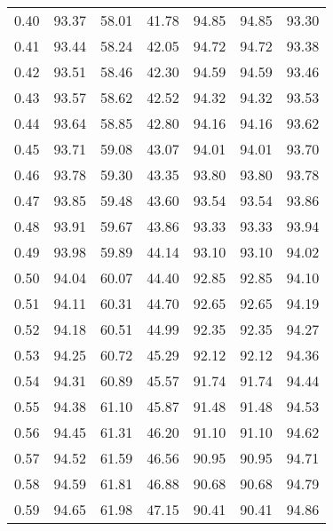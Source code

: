 \begin{tabular}{|c|c|c|c|c|c|c|}
      0.40 &     93.37 &     58.01 &      41.78 &   94.85 &      94.85 &         93.30 \\
      0.41 &     93.44 &     58.24 &      42.05 &   94.72 &      94.72 &         93.38 \\
      0.42 &     93.51 &     58.46 &      42.30 &   94.59 &      94.59 &         93.46 \\
      0.43 &     93.57 &     58.62 &      42.52 &   94.32 &      94.32 &         93.53 \\
      0.44 &     93.64 &     58.85 &      42.80 &   94.16 &      94.16 &         93.62 \\
      0.45 &     93.71 &     59.08 &      43.07 &   94.01 &      94.01 &         93.70 \\
      0.46 &     93.78 &     59.30 &      43.35 &   93.80 &      93.80 &         93.78 \\
      0.47 &     93.85 &     59.48 &      43.60 &   93.54 &      93.54 &         93.86 \\
      0.48 &     93.91 &     59.67 &      43.86 &   93.33 &      93.33 &         93.94 \\
      0.49 &     93.98 &     59.89 &      44.14 &   93.10 &      93.10 &         94.02 \\
      0.50 &     94.04 &     60.07 &      44.40 &   92.85 &      92.85 &         94.10 \\
      0.51 &     94.11 &     60.31 &      44.70 &   92.65 &      92.65 &         94.19 \\
      0.52 &     94.18 &     60.51 &      44.99 &   92.35 &      92.35 &         94.27 \\
      0.53 &     94.25 &     60.72 &      45.29 &   92.12 &      92.12 &         94.36 \\
      0.54 &     94.31 &     60.89 &      45.57 &   91.74 &      91.74 &         94.44 \\
      0.55 &     94.38 &     61.10 &      45.87 &   91.48 &      91.48 &         94.53 \\
      0.56 &     94.45 &     61.31 &      46.20 &   91.10 &      91.10 &         94.62 \\
      0.57 &     94.52 &     61.59 &      46.56 &   90.95 &      90.95 &         94.71 \\
      0.58 &     94.59 &     61.81 &      46.88 &   90.68 &      90.68 &         94.79 \\
      0.59 &     94.65 &     61.98 &      47.15 &   90.41 &      90.41 &         94.86 \\

\end{tabular}
